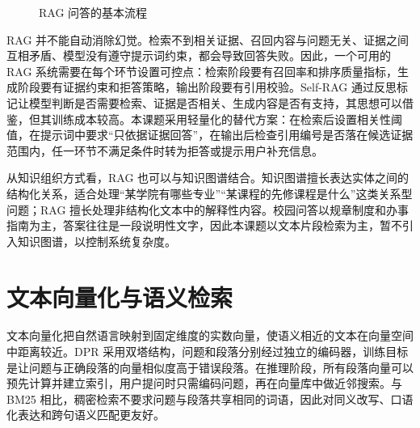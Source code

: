 \begin{figure}[H]
  \centering
  \caption{RAG 问答的基本流程}
  \label{fig:rag-flow}
\end{figure}

RAG 并不能自动消除幻觉。检索不到相关证据、召回内容与问题无关、证据之间互相矛盾、模型没有遵守提示词约束，都会导致回答失败。因此，一个可用的 RAG 系统需要在每个环节设置可控点：检索阶段要有召回率和排序质量指标，生成阶段要有证据约束和拒答策略，输出阶段要有引用校验。Self-RAG 通过反思标记让模型判断是否需要检索、证据是否相关、生成内容是否有支持，其思想可以借鉴，但其训练成本较高。本课题采用轻量化的替代方案：在检索后设置相关性阈值，在提示词中要求“只依据证据回答”，在输出后检查引用编号是否落在候选证据范围内，任一环节不满足条件时转为拒答或提示用户补充信息。

从知识组织方式看，RAG 也可以与知识图谱结合。知识图谱擅长表达实体之间的结构化关系，适合处理“某学院有哪些专业”“某课程的先修课程是什么”这类关系型问题；RAG 擅长处理非结构化文本中的解释性内容。校园问答以规章制度和办事指南为主，答案往往是一段说明性文字，因此本课题以文本片段检索为主，暂不引入知识图谱，以控制系统复杂度。

\section{文本向量化与语义检索}
\label{sec:embedding}

文本向量化把自然语言映射到固定维度的实数向量，使语义相近的文本在向量空间中距离较近。DPR 采用双塔结构，问题和段落分别经过独立的编码器，训练目标是让问题与正确段落的向量相似度高于错误段落。在推理阶段，所有段落向量可以预先计算并建立索引，用户提问时只需编码问题，再在向量库中做近邻搜索。与 BM25 相比，稠密检索不要求问题与段落共享相同的词语，因此对同义改写、口语化表达和跨句语义匹配更友好。

